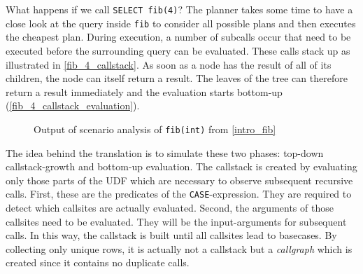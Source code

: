 What happens if we call \texttt{SELECT fib(4)}? The planner takes some time to have a close look at the query inside \texttt{fib} to consider all possible plans and then executes the cheapest plan. During execution, a number of subcalls occur that need to be executed before the surrounding query can be evaluated. These calls stack up as illustrated in \autoref{fib_4_callstack}. As soon as a node has the result of all of its children, the node can itself return a result. The leaves of the tree can therefore return a result immediately and the evaluation starts bottom-up (\autoref{fib_4_callstack_evaluation}). 


\begin{figure}[h!]
    \begin{minipage}[b]{.45\linewidth}
    \centering\large
    \vspace{8mm}
    \label{intro_fib}
    \end{minipage}\hfill
    \begin{minipage}[b]{.45\linewidth}
    \centering\small
    \vspace{-8mm}
    
    \label{fib_rec_scenarios}
    \end{minipage}
    \caption{Output of scenario analysis of \texttt{fib(int)} from \autoref{intro_fib}}\label{fib_analysis_output}
\end{figure}


\begin{figure}[h]
\centering

\caption{}\label{tbl:callgraph}
\end{figure}

The idea behind the translation is to simulate these two phases: top-down callstack-growth and bottom-up evaluation. The callstack is created by evaluating only those parts of the UDF which are necessary to observe subsequent recursive calls. First, these are the predicates of the \texttt{CASE}-expression. They are required to detect which callsites are actually evaluated. Second, the arguments of those callsites need to be evaluated. They will be the input-arguments for subsequent calls. In this way, the callstack is built until all callsites lead to basecases. By collecting only unique rows, it is actually not a callstack but a \textit{callgraph} which is created since it contains no duplicate calls.




